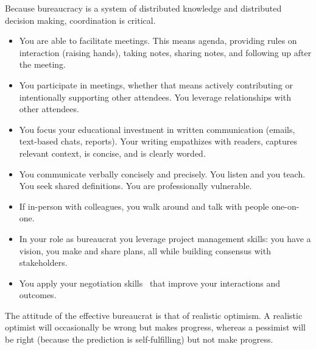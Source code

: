 Because bureaucracy is a system of distributed knowledge and distributed decision making, coordination is critical. 
\begin{itemize}
    \item You are able to facilitate meetings. This means agenda, providing rules on interaction (raising hands), taking notes, sharing notes, and following up after the meeting.
    \item You participate in meetings, whether that means actively contributing or intentionally supporting other attendees. You leverage relationships with other attendees. 
    \item You focus your educational investment in written communication (emails, text-based chats, reports). Your writing empathizes with readers, captures relevant context, is concise, and is clearly worded.
    \item You communicate verbally concisely and precisely. You listen and you teach. You seek shared definitions. You are professionally vulnerable. 
    \item If in-person with colleagues, you walk around and talk with people one-on-one.  
    \item In your role as bureaucrat you leverage project management skills: you have a vision, you make and share plans, all while building consensus with stakeholders.
    \item You apply your negotiation skills~\cite{1982_Cohen} that improve your interactions and outcomes.
\end{itemize}

The attitude of the effective bureaucrat  is that of realistic optimism. A realistic optimist will occasionally be wrong but makes progress, whereas a pessimist will be right (because the prediction is self-fulfilling) but not make progress.
